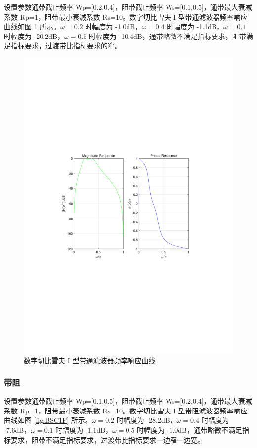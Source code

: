 \documentclass[12pt,AutoFakeBold]{article}
\begin{document}
设置参数通带截止频率 Wp=[0.2,0.4]，阻带截止频率 Ws=[0.1,0.5]，通带最大衰减系数 Rp=1，阻带最小衰减系数 Rs=10。数字切比雪夫 I 型带通滤波器频率响应曲线如图 \ref{fig:BPC1F} 所示。$\omega=0.2$ 时幅度为 -1.0dB，$\omega=0.4$ 时幅度为 -1.1dB，$\omega=0.1$ 时幅度为 -20.2dB，$\omega=0.5$ 时幅度为 -10.4dB，通带略微不满足指标要求，阻带满足指标要求，过渡带比指标要求的窄。

\begin{figure}[hbtp]
	\centering
	\includegraphics[width=14cm]{figure/BPC1F.pdf}
	\caption{数字切比雪夫 I 型带通滤波器频率响应曲线} \label{fig:BPC1F}
\end{figure}

\subsubsection{带阻}

设置参数通带截止频率 Wp=[0.1,0.5]，阻带截止频率 Ws=[0.2,0.4]，通带最大衰减系数 Rp=1，阻带最小衰减系数 Rs=10。数字切比雪夫 I 型带阻滤波器频率响应曲线如图 \ref{fig:BSC1F} 所示。$\omega=0.2$ 时幅度为 -28.2dB，$\omega=0.4$ 时幅度为 -7.6dB，$\omega=0.1$ 时幅度为 -1.1dB，$\omega=0.5$ 时幅度为 -1.0dB，通带略微不满足指标要求，阻带不满足指标要求，过渡带比指标要求一边窄一边宽。
\end{document}
